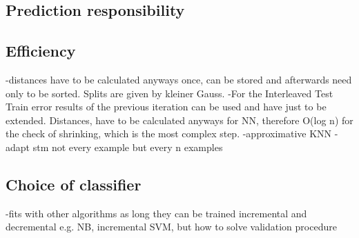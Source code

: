 \documentclass[conference]{IEEEtran}
\begin{document}
\subsection{Prediction responsibility}



\subsection{Efficiency}\label{efficiency}
-distances have to be calculated anyways once, can be stored and afterwards need only to be sorted. Splits are given by kleiner Gauss.
-For the Interleaved Test Train error results of the previous iteration can be used and have just to be extended. Distances, have to be calculated anyways for NN,
therefore O(log n) for the check of shrinking, which is the most complex step.
-approximative KNN
-adapt stm not every example but every n examples

\subsection{Choice of classifier}
-fits with other algorithms as long they can be trained incremental and decremental e.g. NB, incremental SVM, but how to solve validation procedure
\end{document}
